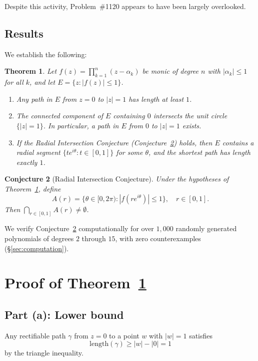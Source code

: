 \documentclass[11pt]{article}
\newtheorem{theorem}{Theorem}
\newtheorem{conjecture}[theorem]{Conjecture}
\theoremstyle{definition}
\theoremstyle{remark}
\begin{document}
Despite this activity, Problem~\#1120 appears to have been largely overlooked.

\subsection{Results}

We establish the following:

\begin{theorem}\label{thm:main}
Let $f(z)=\prod_{k=1}^n(z-\alpha_k)$ be monic of degree $n$ with $|\alpha_k|\leq 1$ for all $k$, and let $E=\{z:|f(z)|\leq 1\}$.
\begin{enumerate}
\item[\emph{(a)}] Any path in $E$ from $z=0$ to $|z|=1$ has length at least $1$.
\item[\emph{(b)}] The connected component of $E$ containing $0$ intersects the unit circle $\{|z|=1\}$. In particular, a path in $E$ from $0$ to $|z|=1$ exists.
\item[\emph{(c)}] If the Radial Intersection Conjecture \emph{(Conjecture~\ref{conj:radial})} holds, then $E$ contains a radial segment $\{te^{i\theta}:t\in[0,1]\}$ for some $\theta$, and the shortest path has length exactly $1$.
\end{enumerate}
\end{theorem}

\begin{conjecture}[Radial Intersection Conjecture]\label{conj:radial}
Under the hypotheses of Theorem~\ref{thm:main}, define
\[
A(r) = \{\theta\in[0,2\pi) : |f(re^{i\theta})|\leq 1\}, \quad r\in[0,1].
\]
Then $\displaystyle\bigcap_{r\in[0,1]} A(r) \neq \emptyset$.
\end{conjecture}

We verify Conjecture~\ref{conj:radial} computationally for over $1{,}000$ randomly generated polynomials of degrees $2$ through $15$, with zero counterexamples (\S\ref{sec:computation}).

\section{Proof of Theorem~\ref{thm:main}}

\subsection{Part (a): Lower bound}

Any rectifiable path $\gamma$ from $z=0$ to a point $w$ with $|w|=1$ satisfies
\[
\mathrm{length}(\gamma) \geq |w|-|0| = 1
\]
by the triangle inequality.
\end{document}
